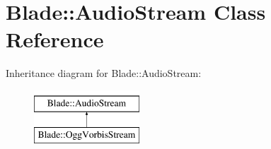 \hypertarget{class_blade_1_1_audio_stream}{}\section{Blade\+:\+:Audio\+Stream Class Reference}
\label{class_blade_1_1_audio_stream}
Inheritance diagram for Blade\+:\+:Audio\+Stream\+:\begin{figure}[H]
\begin{center}
\leavevmode
\includegraphics[height=2.000000cm]{class_blade_1_1_audio_stream}
\end{center}
\end{figure}
